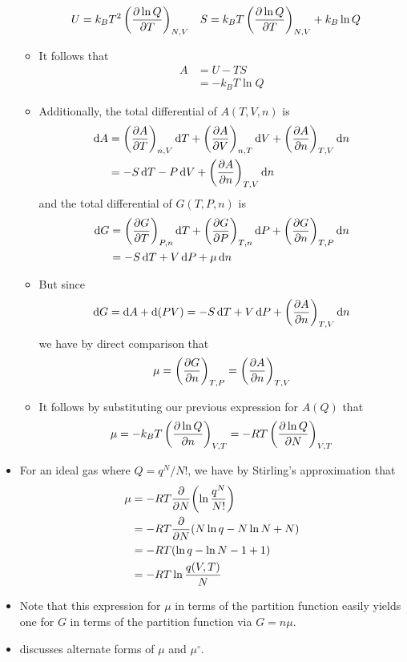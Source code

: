 \documentclass[../notes.tex]{subfiles}
\begin{document}
\begin{itemize}
\begin{itemize}
\begin{align*}
            U &= k_BT^2\left( \pdv{\ln Q}{T} \right)_{N,V}&
            S &= k_BT\left( \pdv{\ln Q}{T} \right)_{N,V}+k_B\ln Q
        \end{align*}
        \item It follows that
        \begin{align*}
            A &= U-TS\\
            &= -k_BT\ln Q
        \end{align*}
        \item Additionally, the total differential of $A(T,V,n)$ is
        \begin{align*}
            \dd{A} &= \left( \pdv{A}{T} \right)_{n,V}\dd{T}+\left( \pdv{A}{V} \right)_{n,T}\dd{V}+\left( \pdv{A}{n} \right)_{T,V}\dd{n}\\
            &= -S\dd{T}-P\dd{V}+\left( \pdv{A}{n} \right)_{T,V}\dd{n}
        \end{align*}
        and the total differential of $G(T,P,n)$ is
        \begin{align*}
            \dd{G} &= \left( \pdv{G}{T} \right)_{P,n}\dd{T}+\left( \pdv{G}{P} \right)_{T,n}\dd{P}+\left( \pdv{G}{n} \right)_{T,P}\dd{n}\\
            &= -S\dd{T}+V\dd{P}+\mu\dd{n}
        \end{align*}
        \item But since
        \begin{equation*}
            \dd{G} = \dd{A}+\dd{(PV)}
            = -S\dd{T}+V\dd{P}+\left( \pdv{A}{n} \right)_{T,V}\dd{n}
        \end{equation*}
        we have by direct comparison that
        \begin{equation*}
            \mu = \left( \pdv{G}{n} \right)_{T,P}
            = \left( \pdv{A}{n} \right)_{T,V}
        \end{equation*}
        \item It follows by substituting our previous expression for $A(Q)$ that
        \begin{equation*}
            \mu = -k_BT\left( \pdv{\ln Q}{n} \right)_{V,T}
            = -RT\left( \pdv{\ln Q}{N} \right)_{V,T}
        \end{equation*}
    \end{itemize}
    \item For an ideal gas where $Q=q^N/N!$, we have by Stirling's approximation that
    \begin{align*}
        \mu &= -RT\pdv{N}(\ln\frac{q^N}{N!})\\
        &= -RT\pdv{N}(N\ln q-N\ln N+N)\\
        &= -RT(\ln q-\ln N-1+1)\\
        &= -RT\ln\frac{q(V,T)}{N}
    \end{align*}
    \item Note that this expression for $\mu$ in terms of the partition function easily yields one for $G$ in terms of the partition function via $G=n\mu$.
    \item \textcite{bib:McQuarrieSimon} discusses alternate forms of $\mu$ and $\mu^\circ$.
\end{itemize}
\end{document}
